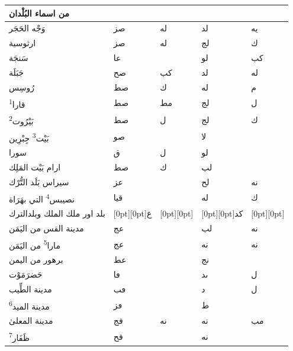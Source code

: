 \documentclass[11pt]{article}
\newcommand{\AbjadZero}{{\NallinoSigns\symbol{"E000}}}
\begin{document}
\begin{Arabic}
\noindent\begin{minipage}[t]{0.495\textwidth}\setlength{\tabcolsep}{2.2pt}\begin{tabular}{|p{55mm}|>{\centering\arraybackslash}p{4.8mm}>{\centering\arraybackslash}p{4.8mm}|>{\centering\arraybackslash}p{4.8mm}>{\centering\arraybackslash}p{4.8mm}|}\hline
\centering من اسماء البُلْدان & \multicolumn{2}{c|}{الطول} & \multicolumn{2}{c|}{العرض} \\ \hline
{}وَجْه الحَجَر & صز & له & لد & يه \\
{}ارثوسية & صز & له & لج & ك \\
{}سَنجَة & عا & \AbjadZero{} & لو & كب \\
{}جَبَلَة & صح & كب & لد & له \\
{}رُوسِس & صط & ك & له & م \\
{}قارا\textsuperscript{1} & صط & مط & لج & ل \\
{}بَيْرُوت\textsuperscript{2} & صط & ل & لج & ك \\
{}بَيْت\textsuperscript{3} جِبْرِين & صو & \AbjadZero{} & لا & \AbjadZero{} \\
{}سورا & ق & ل & لو & \AbjadZero{} \\
{}ارام بَيْت المَلِك & صط & ك & لب & \AbjadZero{} \\
{}سيراس بَلَد التُّرْك & عز & \AbjadZero{} & لح & نه \\
{}نصيبس\textsuperscript{4} التي بهَرَاة & قيا & \AbjadZero{} & له & ك \\
{}بلد اور ملك الملك وبلد\newline الترك & \raisebox{-1\normalbaselineskip}[0pt][0pt]{ع} & \raisebox{-1\normalbaselineskip}[0pt][0pt]{\AbjadZero{}} & \raisebox{-1\normalbaselineskip}[0pt][0pt]{كد} & \raisebox{-1\normalbaselineskip}[0pt][0pt]{\AbjadZero{}} \\
{}مدينة القس من اليَمَن & عج & \AbjadZero{} & لب & نه \\
{}مارا\textsuperscript{5} من اليَمَن & عج & \AbjadZero{} & نه & نه \\
{}برهور من اليمن & عط & \AbjadZero{} & نج & \AbjadZero{} \\
{}حَضرَمَوْت & ڡا & \AbjadZero{} & ىد & ل \\
{}مدينة الطِّيب & ڡب & \AbjadZero{} & د & ل \\
{}مدينة الميد\textsuperscript{6} & ٯز & \AbjadZero{} & ط & \AbjadZero{} \\
{}مدينة المعلىٰ & فج & نه & نه & مب \\
{}ظَفَار\textsuperscript{7} & فح & \AbjadZero{} & نه & \AbjadZero{} \\

\end{tabular}
\end{minipage}
\end{Arabic}
\end{document}
